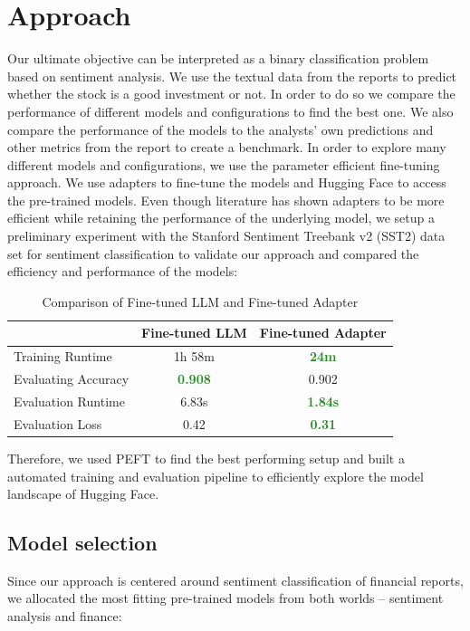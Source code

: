\documentclass[conference]{IEEEtran}
\begin{document}
\section{Approach}%
Our ultimate objective can be interpreted as a binary classification problem based on sentiment analysis. We use the textual data from the reports to predict whether the stock is a good investment or not. In order to do so we compare the performance of different models and configurations to find the best one. We also compare the performance of the models to the analysts' own predictions and other metrics from the report to create a benchmark. In order to explore many different models and configurations, we use the parameter efficient fine-tuning approach. We use adapters to fine-tune the models and Hugging Face to access the pre-trained models. Even though literature has shown adapters to be more efficient while retaining the performance of the underlying model, we setup a preliminary experiment with the Stanford Sentiment Treebank v2 (SST2) data set for sentiment classification to validate our approach and compared the efficiency and performance of the models:

\begin{table}[h!]
    \centering
    \begin{tabular}{lcc}
    \toprule
     & \textbf{Fine-tuned LLM} & \textbf{Fine-tuned Adapter} \\
     \midrule
    {Training Runtime} & 1h 58m & \textbf{\textcolor{ForestGreen}{24m}} \\
    {Evaluating Accuracy} & \textbf{\textcolor{ForestGreen}{0.908}} & 0.902 \\
    {Evaluation Runtime} & 6.83s & \textbf{\textcolor{ForestGreen}{1.84s}} \\
    {Evaluation Loss} & 0.42 & \textbf{\textcolor{ForestGreen}{0.31}} \\
    \bottomrule
    \end{tabular}
    \caption{Comparison of Fine-tuned LLM and Fine-tuned Adapter}
    \label{tab:comparison}
    \end{table}


Therefore, we used PEFT to find the best performing setup and built a automated training and evaluation pipeline to efficiently explore the model landscape of Hugging Face.

\subsection{Model selection}%
Since our approach is centered around sentiment classification of financial reports, we allocated the most fitting pre-trained models from both worlds -- sentiment analysis and finance:
\end{document}
